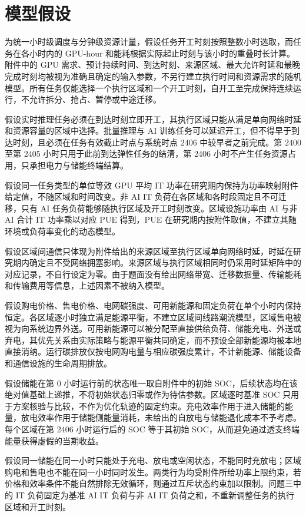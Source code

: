 \documentclass[withoutpreface,bwprint]{cumcmthesis}
\begin{document}
\section{模型假设}

为统一小时级调度与分钟级资源计量，假设任务开工时刻按照整数小时选取，而任务在各小时内的 GPU-hour 和能耗根据实际起止时刻与该小时的重叠时长计算。附件中的 GPU 需求、预计持续时间、到达时刻、来源区域、最大允许时延和最晚完成时刻均被视为准确且确定的输入参数，不另行建立执行时间和资源需求的随机模型。所有任务仅能选择一个执行区域和一个开工时刻，自开工至完成保持连续运行，不允许拆分、抢占、暂停或中途迁移。

假设实时推理任务必须在到达时刻立即开工，其执行区域只能从满足单向网络时延和资源容量的区域中选择。批量推理与 AI 训练任务可以延迟开工，但不得早于到达时刻，且必须在任务有效截止时点与系统时点 $2406$ 中较早者之前完成。第 $2400$ 至第 $2405$ 小时只用于此前到达弹性任务的结清，第 $2406$ 小时不产生任务资源占用，只承担电力与储能终端结算。

假设同一任务类型的单位等效 GPU 平均 IT 功率在研究期内保持为功率映射附件给定值，不随区域和时间改变。非 AI IT 负荷在各区域和各时段固定且不可迁移，只有 AI 任务负荷能够随执行区域及开工时刻改变。区域设施功率由 AI 与非 AI 合计 IT 功率乘以对应 PUE 得到，PUE 在研究期内按附件取值，不建立其随环境或负荷率变化的动态模型。

假设区域间通信只体现为附件给出的来源区域至执行区域单向网络时延，时延在研究期内确定且不受网络拥塞影响。来源区域与执行区域相同时仍采用时延矩阵中的对应记录，不自行设定为零。由于题面没有给出网络带宽、迁移数据量、传输能耗和传输费用等信息，上述因素不被纳入模型。

假设购电价格、售电价格、电网碳强度、可用新能源和固定负荷在单个小时内保持恒定。各区域逐小时独立满足能源平衡，不建立区域间线路潮流模型，区域售电被视为向系统边界外送。可用新能源可以被分配至直接供给负荷、储能充电、外送或弃电，其优先关系由实际策略与能源平衡共同确定，而不预设全部新能源均被本地直接消纳。运行碳排放仅按电网购电量与相应碳强度累计，不计新能源、储能设备和通信设施的生命周期排放。

假设储能在第 $0$ 小时运行前的状态唯一取自附件中的初始 SOC，后续状态均在该绝对值基础上递推，不将初始状态归零或作为待估参数。区域逐时基准 SOC 只用于方案核验与比较，不作为优化轨迹的固定约束。充电效率作用于进入储能的能量，放电效率作用于储能侧能量消耗，未给出的自放电与储能退化成本不予考虑。每个区域在第 $2406$ 小时运行后的 SOC 等于其初始 SOC，从而避免通过透支终端能量获得虚假的当期收益。

假设同一储能在同一小时只能处于充电、放电或空闲状态，不能同时充放电；区域购电和售电也不能在同一小时同时发生。两类行为均受附件所给功率上限约束，若价格和效率条件不能自然排除无效循环，则通过互斥状态约束加以限制。问题三中的 IT 负荷固定为基准 AI IT 负荷与非 AI IT 负荷之和，不重新调整任务的执行区域和开工时刻。
\end{document}
